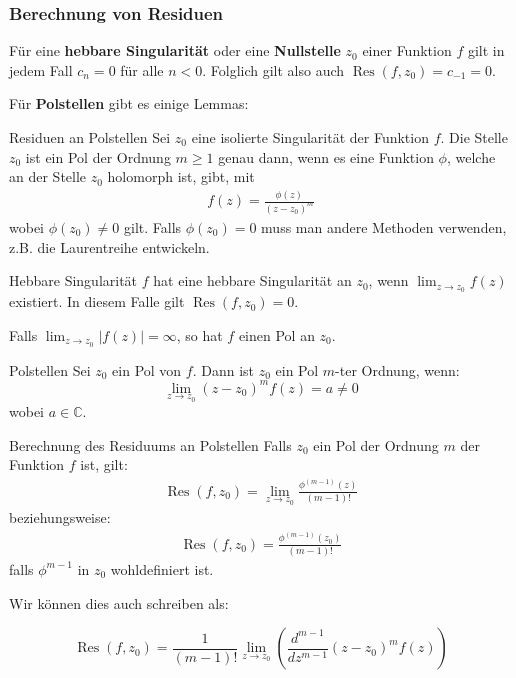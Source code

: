\documentclass[a4paper,10pt]{article}
\DeclareMathOperator{\Res}{Res}
\def\C{\mathbb{C}}
\begin{document}
\subsubsection{Berechnung von Residuen}

Für eine \textbf{hebbare Singularität} oder eine \textbf{Nullstelle} $z_0$ einer Funktion $f$ gilt in jedem Fall $c_n = 0$ für alle $n < 0$. Folglich gilt also auch $\Res(f, z_0) = c_{-1} = 0$.

Für \textbf{Polstellen} gibt es einige Lemmas:

\begin{subbox}{Residuen an Polstellen}
  Sei \(z_0\) eine isolierte Singularität der Funktion \(f\). Die Stelle \(z_0\) ist ein Pol der Ordnung \(m\geq1\) genau dann, wenn es eine Funktion $\phi$, welche an der Stelle \(z_0\) holomorph ist, gibt, mit \begin{align*} f(z)=\frac{\phi(z)}{(z-z_0)^m} \end{align*} wobei \(\phi(z_0)\neq0\) gilt. Falls $\phi(z_0) = 0$ muss man andere Methoden verwenden, z.B. die Laurentreihe entwickeln.
\end{subbox}

\begin{subbox}{Hebbare Singularität}
  $f$ hat eine hebbare Singularität an $z_0$, wenn $\lim_{z \to z_0} f(z)$ existiert. In diesem Falle gilt $\Res(f, z_0) = 0$.
\end{subbox}

Falls $\lim_{z \to z_0} |f(z)| = \infty$, so hat $f$ einen Pol an $z_0$.

\begin{subbox}{Polstellen}
  Sei $z_0$ ein Pol von $f$. Dann ist $z_0$ ein Pol $m$-ter Ordnung, wenn:
  $$
    \lim_{z \to z_0} (z - z_0)^m f(z) = a \neq 0
  $$
  wobei $a \in \C$.
\end{subbox}

\begin{mainbox}{Berechnung des Residuums an Polstellen}
  Falls \(z_0\) ein Pol der Ordnung \(m\) der Funktion \(f\) ist, gilt: \begin{align*} 
     \operatorname{Res}(f,z_0)= \lim_{z \to z_0} \frac{\phi^{(m-1)}(z)}{(m-1)!} 
  \end{align*}
  beziehungsweise:
  \begin{align*} 
    \operatorname{Res}(f,z_0)= \frac{\phi^{(m-1)}(z_0)}{(m-1)!} 
 \end{align*}
 falls $\phi^{m-1}$ in $z_0$ wohldefiniert ist.

 Wir können dies auch schreiben als:

$$
  \Res(f, z_0) = \frac{1}{(m - 1)!} \lim_{z \to z_0} \left( \frac{d^{m-1}}{dz^{m-1}} (z - z_0)^m f(z) \right)
$$
\end{mainbox}
\end{document}
